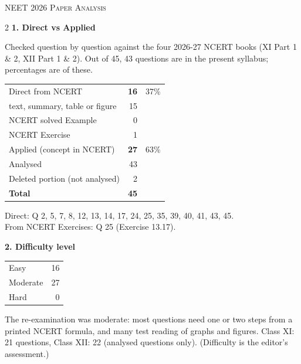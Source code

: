 \clearpage
\begin{center}{}\par
{\fontsize{20}{24}\selectfont\color{navy}\scshape NEET 2026 \textperiodcentered{} Paper Analysis}\par
{\color{gilt}}\end{center}
\vspace{4pt}
\begin{multicols}{2}
\textbf{\color{crimson}1. Direct vs Applied}\par\smallskip
{\footnotesize Checked question by question against the four 2026-27 NCERT books (XI Part 1 \& 2, XII Part 1 \& 2). Out of 45, 43 questions are in the present syllabus; percentages are of these.}\par\smallskip
\begin{tabular}{@{}lrr@{}}\toprule
Direct from NCERT & \textbf{16} & 37\%\\
\quad text, summary, table or figure & 15 &\\
\quad NCERT solved Example & 0 &\\
\quad NCERT Exercise & 1 &\\
Applied (concept in NCERT) & \textbf{27} & 63\%\\\midrule
Analysed & 43 &\\
Deleted portion (not analysed) & 2 &\\\midrule
\textbf{Total} & \textbf{45} &\\\bottomrule\end{tabular}\par\smallskip
{\footnotesize Direct: Q 2, 5, 7, 8, 12, 13, 14, 17, 24, 25, 35, 39, 40, 41, 43, 45.\\ From NCERT Exercises: Q 25 (Exercise 13.17).}\par\medskip
\textbf{\color{crimson}2. Difficulty level}\par\smallskip
\begin{tabular}{@{}lr@{}}\toprule
Easy & 16\\ Moderate & 27\\ Hard & 0\\\bottomrule\end{tabular}\par\smallskip
{\footnotesize The re-examination was moderate: most questions need one or two steps from a printed NCERT formula, and many test reading of graphs and figures. Class XI: 21 questions, Class XII: 22 (analysed questions only). (Difficulty is the editor's assessment.)}\par\medskip

\end{multicols}
